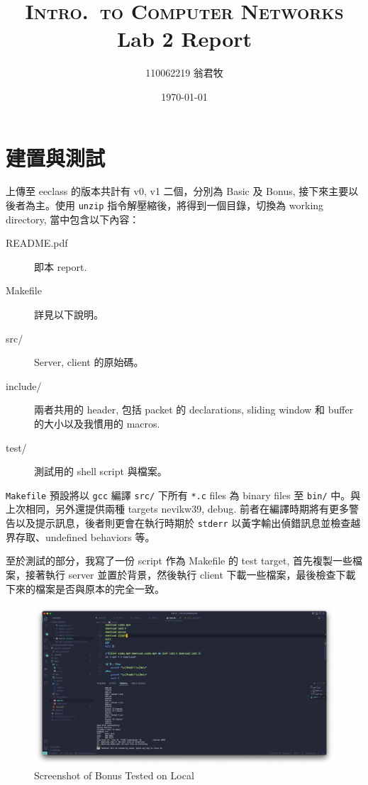 \documentclass[12pt, a4paper]{article}
\title{\textsc{Intro.~to Computer Networks}\\Lab 2 Report}
\author{110062219 翁君牧}
\date{\today}
\begin{document}
\maketitle

\tableofcontents

\section{建置與測試}

上傳至 eeclass 的版本共計有 v0, v1 二個，分別為 Basic 及  Bonus, 接下來主要以後者為主。使用 \texttt{unzip} 指令解壓縮後，將得到一個目錄，切換為 working directory, 當中包含以下內容：

\begin{description}
\item[\ttfamily README.pdf] 即本 report.
\item[\ttfamily Makefile] 詳見以下說明。
\item[\ttfamily src/] Server, client 的原始碼。
\item[\ttfamily include/] 兩者共用的 header, 包括 packet 的 declarations, sliding window 和 buffer 的大小以及我慣用的 macros.
\item[\ttfamily test/] 測試用的 shell script 與檔案。
\end{description}

\texttt{Makefile} 預設將以 \texttt{gcc} 編譯 \texttt{src/} 下所有 \texttt{*.c} files 為 binary files 至 \texttt{bin/} 中。與上次相同，另外還提供兩種 targets \textsf{nevikw39}, \textsf{debug}. 前者在編譯時期將有更多警告以及提示訊息，後者則更會在執行時期於 \texttt{stderr} 以黃字輸出偵錯訊息並檢查越界存取、undefined behaviors 等。

至於測試的部分，我寫了一份 script 作為 Makefile 的 \textsf{test} target, 首先複製一些檔案，接著執行 server 並置於背景，然後執行 client 下載一些檔案，最後檢查下載下來的檔案是否與原本的完全一致。

\begin{figure}[htbp]
\centering
\includegraphics[width=\linewidth]{screenshot}
\caption{Screenshot of Bonus Tested on Local}
\label{fig:screenshot}
\end{figure}
\end{document}

